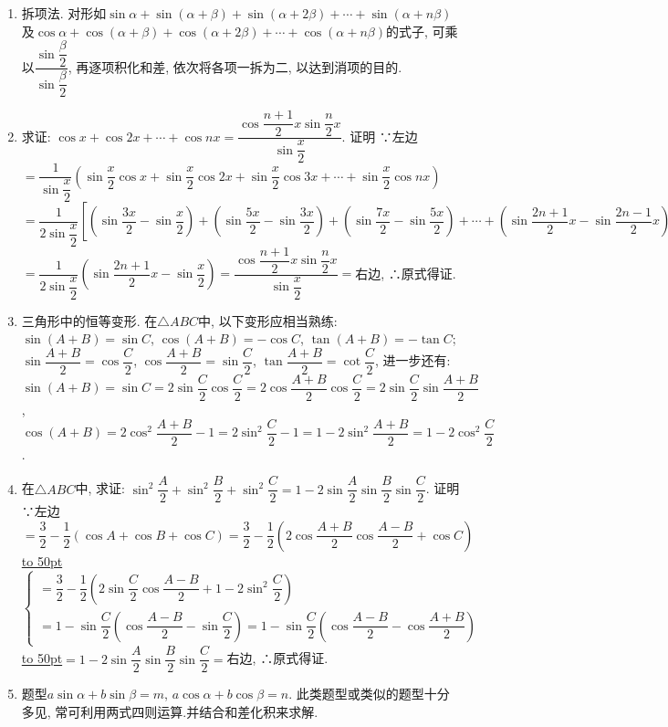 \documentclass[10pt,a4paper]{article}
\newcommand{\blank}[1]{\underline{\hbox to #1pt{}}}
\begin{document}
\begin{enumerate}[1.]
(3)已知$\sin \alpha -\cos \alpha =\dfrac 12$, 且$\pi <\alpha <2\pi$, 求$\tan \dfrac{\alpha}2$的值.
(4)已知$\cos \alpha =-\dfrac 35$, 且$\alpha$为第二象限角, 求$\dfrac{\tan \dfrac{\pi +\alpha}4}{1-\cot ^2\dfrac{\pi -\alpha}4}$的值.
二、积化和差与和差化积公式
【典型题型和解题技巧】
\item 拆项法.
对形如$\sin \alpha +\sin (\alpha +\beta)+\sin (\alpha +2\beta)+\cdots +\sin (\alpha +n\beta)$及$\cos \alpha +\cos (\alpha +\beta)+\cos (\alpha +2\beta)+\cdots +\cos (\alpha +n\beta)$的式子, 可乘以$\dfrac{\sin \dfrac{\beta}2}{\sin \dfrac{\beta}2}$, 再逐项积化和差, 依次将各项一拆为二, 以达到消项的目的.
\item 求证: $\cos x+\cos 2x+\cdots +\cos nx=\dfrac{\cos \dfrac{n+1}2x\sin \dfrac n2x}{\sin \dfrac x2}$.
证明  ∵左边$=\dfrac 1{\sin \dfrac x2}(\sin \dfrac x2\cos x+\sin \dfrac x2\cos 2x+\sin \dfrac x2\cos 3x+\cdots +\sin \dfrac x2\cos nx)$
$=\dfrac 1{2\sin \dfrac x2}[(\sin \dfrac{3x}2-\sin \dfrac x2)+(\sin \dfrac{5x}2-\sin \dfrac{3x}2)+(\sin \dfrac{7x}2-\sin \dfrac{5x}2)+\cdots +(\sin \dfrac{2n+1}2x-\sin \dfrac{2n-1}2x)]$
$=\dfrac 1{2\sin \dfrac x2}(\sin \dfrac{2n+1}2x-\sin \dfrac x2)=\dfrac{\cos \dfrac{n+1}2x\sin \dfrac n2x}{\sin \dfrac x2}=$右边,
∴原式得证.
\item 三角形中的恒等变形.
在$\triangle ABC$中, 以下变形应相当熟练:
$\sin (A+B)=\sin C$, $\cos (A+B)=-\cos C$, $\tan (A+B)=-\tan C$;
$\sin \dfrac{A+B}2=\cos \dfrac C2$, $\cos \dfrac{A+B}2=\sin \dfrac C2$, $\tan \dfrac{A+B}2=\cot \dfrac C2$,
进一步还有: $\sin (A+B)=\sin C=2\sin \dfrac C2\cos \dfrac C2=2\cos \dfrac{A+B}2\cos \dfrac C2=2\sin \dfrac C2\sin \dfrac{A+B}2$,
$\cos (A+B)=2\cos ^2\dfrac{A+B}2-1=2\sin ^2\dfrac C2-1=1-2\sin ^2\dfrac{A+B}2=1-2\cos ^2\dfrac C2$.
\item 在$\triangle ABC$中, 求证: $\sin ^2\dfrac A2+\sin ^2\dfrac B2+\sin ^2\dfrac C2=1-2\sin \dfrac A2\sin \dfrac B2\sin \dfrac C2$.
证明  ∵左边$=\dfrac 32-\dfrac 12(\cos A+\cos B+\cos C)=\dfrac 32-\dfrac 12(2\cos \dfrac{A+B}2\cos \dfrac{A-B}2+\cos C)$
\blank{50}$\begin{cases} =\dfrac 32-\dfrac 12(2\sin \dfrac C2\cos \dfrac{A-B}2+1-2\sin ^2\dfrac C2) \\ =1-\sin \dfrac C2(\cos \dfrac{A-B}2-\sin \dfrac C2)=1-\sin \dfrac C2(\cos \dfrac{A-B}2-\cos \dfrac{A+B}2) \end{cases}$
\blank{50}$=1-2\sin \dfrac A2\sin \dfrac B2\sin \dfrac C2=$右边,
∴原式得证.
\item 题型$a\sin \alpha +b\sin \beta =m$, $a\cos \alpha +b\cos \beta =n$.
此类题型或类似的题型十分多见, 常可利用两式四则运算.并结合和差化积来求解.

\end{enumerate}
\end{document}
